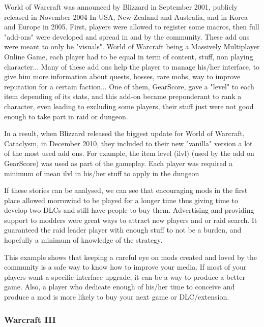 \documentclass[a4paper,12pt]{article}
\begin{document}
World of Warcraft was announced by Blizzard in September 2001, publicly released in November 2004 In USA, New Zealand and Australia, and in Korea and Europe in 2005. First, players were allowed to register some macros, then full "add-ons" were developed and spread in and by the community. These add ons were meant to only be "visuals". World of Warcraft being a Massively Multiplayer Online Game, each player had to be equal in term of content, stuff, non playing character...
Many of these add ons help the player to manage his/her interface, to give him more information about quests, bosses, rare mobs, way to improve reputation for a certain faction... One of them, GearScore, gave a "level" to each item depending of its stats, and this add-on became preponderant to rank a character, even leading to excluding some players, their stuff just were not good enough to take part in raid or dungeon.

In a result, when Blizzard released the biggest update for World of Warcraft, Cataclysm, in December 2010, they included to their new "vanilla" version a lot of the most used add ons. For example, the item level (ilvl)  (used by the add on GearScore) was used as part of the gameplay. Each player was required a minimum of mean ilvl in his/her stuff to apply in the dungeon

If these stories can be analysed, we can see that encouraging mods in the first place allowed morrowind to be played for a longer time thus giving time to develop two DLCs and still have people to buy them. Advertising and providing support to modders were great ways to attract new players and or raid search. It guaranteed the raid leader player with enough stuff to not be a burden, and hopefully a minimum of knowledge of the strategy.

This example shows that keeping a careful eye on mods created and loved by the community is a safe way to know how to improve your media. If most of your players want a specific interface upgrade, it can be a way to produce a better game. Also, a player who dedicate enough of his/her time to conceive and produce a mod is more likely to buy your next game or DLC/extension.

\subsubsection{Warcraft III}
\end{document}
